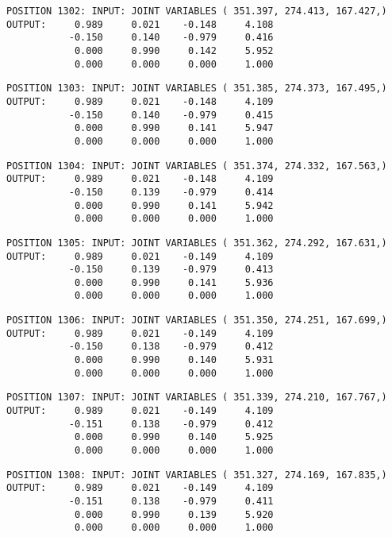 \begin{verbatim}
POSITION 1302: INPUT: JOINT VARIABLES ( 351.397, 274.413, 167.427,)
OUTPUT:     0.989     0.021    -0.148     4.108
           -0.150     0.140    -0.979     0.416
            0.000     0.990     0.142     5.952
            0.000     0.000     0.000     1.000
\end{verbatim} \pagebreak[1]\begin{verbatim}
POSITION 1303: INPUT: JOINT VARIABLES ( 351.385, 274.373, 167.495,)
OUTPUT:     0.989     0.021    -0.148     4.109
           -0.150     0.140    -0.979     0.415
            0.000     0.990     0.141     5.947
            0.000     0.000     0.000     1.000
\end{verbatim} \pagebreak[1]\begin{verbatim}
POSITION 1304: INPUT: JOINT VARIABLES ( 351.374, 274.332, 167.563,)
OUTPUT:     0.989     0.021    -0.148     4.109
           -0.150     0.139    -0.979     0.414
            0.000     0.990     0.141     5.942
            0.000     0.000     0.000     1.000
\end{verbatim} \pagebreak[1]\begin{verbatim}
POSITION 1305: INPUT: JOINT VARIABLES ( 351.362, 274.292, 167.631,)
OUTPUT:     0.989     0.021    -0.149     4.109
           -0.150     0.139    -0.979     0.413
            0.000     0.990     0.141     5.936
            0.000     0.000     0.000     1.000
\end{verbatim} \pagebreak[1]\begin{verbatim}
POSITION 1306: INPUT: JOINT VARIABLES ( 351.350, 274.251, 167.699,)
OUTPUT:     0.989     0.021    -0.149     4.109
           -0.150     0.138    -0.979     0.412
            0.000     0.990     0.140     5.931
            0.000     0.000     0.000     1.000
\end{verbatim} \pagebreak[1]\begin{verbatim}
POSITION 1307: INPUT: JOINT VARIABLES ( 351.339, 274.210, 167.767,)
OUTPUT:     0.989     0.021    -0.149     4.109
           -0.151     0.138    -0.979     0.412
            0.000     0.990     0.140     5.925
            0.000     0.000     0.000     1.000
\end{verbatim} \pagebreak[1]\begin{verbatim}
POSITION 1308: INPUT: JOINT VARIABLES ( 351.327, 274.169, 167.835,)
OUTPUT:     0.989     0.021    -0.149     4.109
           -0.151     0.138    -0.979     0.411
            0.000     0.990     0.139     5.920
            0.000     0.000     0.000     1.000
\end{verbatim} \pagebreak[1]\begin{verbatim}

\end{verbatim}
